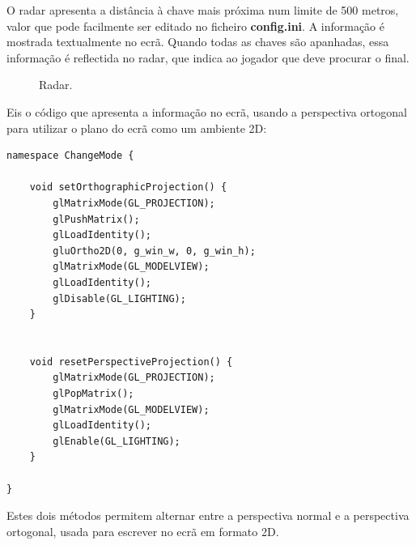 O radar apresenta a distância à chave mais próxima num limite de 500 metros, valor que pode facilmente ser editado no ficheiro \textbf{config.ini}.
A informação é mostrada textualmente no ecrã. Quando todas as chaves são apanhadas, essa informação é reflectida no radar, que indica ao jogador que deve procurar o final.

\begin{figure}[here]
                 \caption{Radar.}
                 \label{fig:prototype}
\end{figure}

Eis o código que apresenta a informação no ecrã, usando a perspectiva ortogonal para utilizar o plano do ecrã como um ambiente 2D:

\begin{lstlisting}[caption=Perspectiva Ortogonal]
namespace ChangeMode {

	void setOrthographicProjection() {
		glMatrixMode(GL_PROJECTION);
		glPushMatrix();
		glLoadIdentity();
		gluOrtho2D(0, g_win_w, 0, g_win_h);
		glMatrixMode(GL_MODELVIEW);
		glLoadIdentity();
		glDisable(GL_LIGHTING);
	}


	void resetPerspectiveProjection() {
		glMatrixMode(GL_PROJECTION);
		glPopMatrix();
		glMatrixMode(GL_MODELVIEW);
		glLoadIdentity();
		glEnable(GL_LIGHTING);
	}

}
\end{lstlisting}

Estes dois métodos permitem alternar entre a perspectiva normal e a perspectiva ortogonal, usada para escrever no ecrã em formato 2D.

